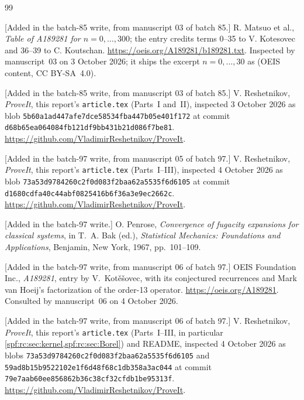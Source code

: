 \documentclass[11pt]{article}
\numberwithin{equation}{section}
\theoremstyle{definition}
\theoremstyle{remark}
\theoremstyle{definition}
\begin{document}
\begin{thebibliography}{99}
\begingroup\raggedright
[Added in the batch-85 write, from manuscript 03 of batch 85.] R. Matsuo et
al., \emph{Table of A189281 for $n=0,\ldots,300$}; the entry credits terms
0--35 to V. Kotesovec and 36--39 to C. Koutschan.
\url{https://oeis.org/A189281/b189281.txt}. Inspected by manuscript~03 on
3 October 2026; it ships the excerpt $n=0,\ldots,30$ as
 (OEIS content, CC
BY-SA~4.0).\par\endgroup

\begingroup\raggedright
[Added in the batch-85 write, from manuscript 03 of batch 85.]
V. Reshetnikov, \emph{ProveIt}, this report's \texttt{article.tex}
(Parts~I and~II), inspected 3 October 2026 as blob
\nolinkurl{5b60a1ad447afe7dce58534fba447b05e401f172} at commit
\nolinkurl{d68b65ea064084fb121df9bb431b21d086f7be81}.
\url{https://github.com/VladimirReshetnikov/ProveIt}.\par\endgroup

\begingroup\raggedright
[Added in the batch-97 write, from manuscript 05 of batch 97.]
V. Reshetnikov, \emph{ProveIt}, this report's \texttt{article.tex}
(Parts~I--III), inspected 4 October 2026 as blob
\nolinkurl{73a53d9784260c2f0d083f2baa62a5535f6d6105} at commit
\nolinkurl{d1680cdfa40c44abf0825416b6f36a3e9ec2662c}.
\url{https://github.com/VladimirReshetnikov/ProveIt}.\par\endgroup

[Added in the batch-97 write.] O. Penrose, \emph{Convergence of fugacity
expansions for classical systems}, in T.~A. Bak (ed.), \emph{Statistical
Mechanics: Foundations and Applications}, Benjamin, New York, 1967,
pp.~101--109.

[Added in the batch-97 write, from manuscript 06 of batch 97.] OEIS
Foundation Inc., \emph{A189281}, entry by V.~Kot\v e\v sovec, with its
conjectured recurrences and Mark van Hoeij's factorization of the order-13
operator. \url{https://oeis.org/A189281}. Consulted by manuscript~06 on
4 October 2026.

\begingroup\raggedright
[Added in the batch-97 write, from manuscript 06 of batch 97.]
V. Reshetnikov, \emph{ProveIt}, this report's \texttt{article.tex}
(Parts~I--III, in particular \cref{spf:rc:sec:kernel,spf:rc:sec:Borel}) and
README, inspected 4 October 2026 as blobs
\nolinkurl{73a53d9784260c2f0d083f2baa62a5535f6d6105} and
\nolinkurl{59ad8b15b9522102e1f6d48f68c1db358a3ac044} at commit
\nolinkurl{79e7aab60ee856862b36c38cf32cfdb1be95313f}.
\url{https://github.com/VladimirReshetnikov/ProveIt}.\par\endgroup


\end{thebibliography}
\end{document}
